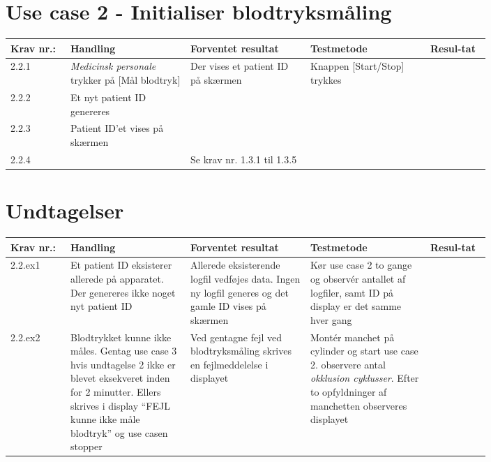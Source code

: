 \section{Use case 2 - Initialiser blodtryksmåling}
		\begin{longtable}{|p{0.1\linewidth}|p{0.2\linewidth}|p{0.2\linewidth}|p{0.2\linewidth}|p{0.1\linewidth}|}
			\hline
			\rowcolor{usDef}
			Krav nr.: & Handling & Forventet resultat & Testmetode & Resul-tat  \\\hline
			2.2.1 & \textit{Medicinsk personale} trykker på [Mål blodtryk] & \multirow{3}{\linewidth}{Der vises et patient ID på skærmen} & \multirow{3}{\linewidth}{Knappen [Start/Stop] trykkes} og displayet observeres & \multirow{3}{\linewidth}{}  \\ \cline{1-2} 
			2.2.2 & Et nyt patient ID genereres & & &  \\ \cline{1-2}
			2.2.3 & Patient ID’et vises på skærmen & & &  \\ \hline
			2.2.4 & & \multicolumn{3}{l|}{Se krav nr. 1.3.1 til 1.3.5} \\ 
			\hline
			
		\end{longtable}
	
	\section*{Undtagelser}
		\begin{longtable}{|p{0.1\linewidth}|p{0.2\linewidth}|p{0.2\linewidth}|p{0.2\linewidth}|p{0.1\linewidth}|}
			\hline
			\rowcolor{usDef}
			Krav nr.: & Handling & Forventet resultat & Testmetode & Resul-tat  \\\hline
			2.2.ex1 & Et patient ID eksisterer allerede på apparatet. Der genereres ikke noget nyt patient ID & Allerede eksisterende logfil vedføjes data. Ingen ny logfil generes og det gamle ID vises på skærmen & Kør use case 2 to gange og observér antallet af logfiler, samt ID på display er det samme hver gang &  \\ \hline
			2.2.ex2 & Blodtrykket kunne ikke måles. Gentag use case 3 hvis undtagelse 2 ikke er blevet eksekveret inden for 2 minutter. Ellers skrives i display “FEJL kunne ikke måle blodtryk” og use casen stopper  & Ved gentagne fejl ved blodtryksmåling skrives en fejlmeddelelse i displayet & Montér manchet på cylinder og start use case 2. observere antal \textit{okklusion cyklusser}. Efter to opfyldninger af manchetten observeres displayet & \\ \hline
		\end{longtable}